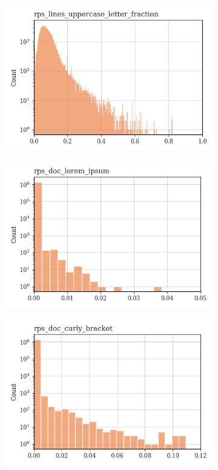 \documentclass{article}
\begin{document}
\begin{figure}
\begin{subfigure}[b]{0.32\textwidth}
        \includegraphics[width=\textwidth]{figures/quality_signals/rps_lines_uppercase_letter_fraction.png}
    \end{subfigure}
    \hfill
    \begin{subfigure}[b]{0.32\textwidth}
        \centering
        \includegraphics[width=\textwidth]{figures/quality_signals/rps_doc_lorem_ipsum.png}
    \end{subfigure}
    \hfill
    \begin{subfigure}[b]{0.32\textwidth}
        \centering
        \includegraphics[width=\textwidth]{figures/quality_signals/rps_doc_curly_bracket.png}

\end{subfigure}
\end{figure}
\end{document}
